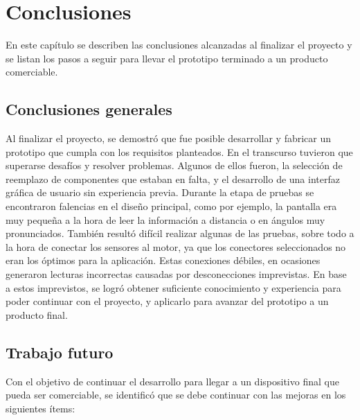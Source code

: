 \chapter{Conclusiones}

\label{Chapter5}

En este capítulo se describen las conclusiones alcanzadas al finalizar el proyecto y se listan los pasos a seguir para llevar el prototipo terminado a un producto comerciable.

\section{Conclusiones generales}

Al finalizar el proyecto, se demostró que fue posible desarrollar y fabricar un prototipo que cumpla con los requisitos planteados. En el transcurso tuvieron que superarse desafíos y resolver problemas. Algunos de ellos fueron, la selección de reemplazo de componentes que estaban en falta, y el desarrollo de una interfaz gráfica de usuario sin experiencia previa.  Durante la etapa de pruebas se encontraron falencias en el diseño principal, como por ejemplo, la pantalla era muy pequeña a la hora de leer la información a distancia o en ángulos muy pronunciados. También resultó difícil realizar algunas de las pruebas, sobre todo a la hora de conectar los sensores al motor, ya que los conectores seleccionados no eran los óptimos para la aplicación. Estas conexiones débiles, en ocasiones generaron lecturas incorrectas causadas por desconecciones imprevistas. En base a estos imprevistos, se logró obtener suficiente conocimiento y experiencia para poder continuar con el proyecto, y aplicarlo para avanzar del prototipo a un producto final.

\section{Trabajo futuro}
Con el objetivo de continuar el desarrollo para llegar a un dispositivo final que pueda ser comerciable, se identificó que se debe continuar con las mejoras en los siguientes ítems:

